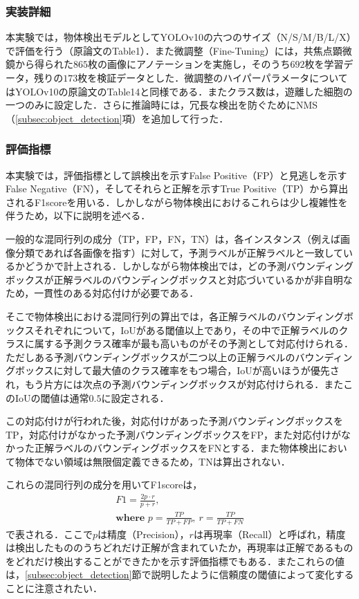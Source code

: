     \subsubsection{実装詳細}

    本実験では，物体検出モデルとしてYOLOv10の六つのサイズ（N/S/M/B/L/X）で評価を行う（原論文\cite{wang2024yolov10}のTable1）．また微調整（Fine-Tuning）には，共焦点顕微鏡から得られた$865$枚の画像にアノテーションを実施し，そのうち$692$枚を学習データ，残りの$173$枚を検証データとした．微調整のハイパーパラメータについてはYOLOv10の原論文\cite{wang2024yolov10}のTable14と同様である．またクラス数は，遊離した細胞の一つのみに設定した．さらに推論時には，冗長な検出を防ぐためにNMS（\ref{subsec:object_detection}項）を追加して行った．

    \subsubsection{評価指標}

    本実験では，評価指標として誤検出を示すFalse Positive（FP）と見逃しを示すFalse Negative（FN），そしてそれらと正解を示すTrue Positive（TP）から算出されるF1scoreを用いる．しかしながら物体検出におけるこれらは少し複雑性を伴うため，以下に説明を述べる．

    一般的な混同行列の成分（TP，FP，FN，TN）は，各インスタンス（例えば画像分類であれば各画像を指す）に対して，予測ラベルが正解ラベルと一致しているかどうかで計上される．しかしながら物体検出では，どの予測バウンディングボックスが正解ラベルのバウンディングボックスと対応づいているかが非自明なため，一貫性のある対応付けが必要である．

    そこで物体検出における混同行列の算出では，各正解ラベルのバウンディングボックスそれぞれについて，IoUがある閾値以上であり，その中で正解ラベルのクラスに属する予測クラス確率が最も高いものがその予測として対応付けられる．ただしある予測バウンディングボックスが二つ以上の正解ラベルのバウンディングボックスに対して最大値のクラス確率をもつ場合，IoUが高いほうが優先され，もう片方には次点の予測バウンディングボックスが対応付けられる．またこのIoUの閾値は通常$0.5$に設定される．

    この対応付けが行われた後，対応付けがあった予測バウンディングボックスをTP，対応付けがなかった予測バウンディングボックスをFP，また対応付けがなかった正解ラベルのバウンディングボックスをFNとする．また物体検出において物体でない領域は無限個定義できるため，TNは算出されない．

    これらの混同行列の成分を用いてF1scoreは，
    \begin{equation}
        \label{eq:f1_score}
        \begin{gathered}
            F1 = \frac{2 p\cdot r}{p + r},
            \\ \textbf{where } p = \frac{TP}{TP + FP}, ~ r = \frac{TP}{TP + FN}
        \end{gathered}
    \end{equation}
    で表される．ここで$p$は精度（Precision），$r$は再現率（Recall）と呼ばれ，精度は検出したもののうちどれだけ正解が含まれていたか，再現率は正解であるものをどれだけ検出することができたかを示す評価指標でもある．またこれらの値は，\ref{subsec:object_detection}節で説明したように信頼度の閾値によって変化することに注意されたい．

